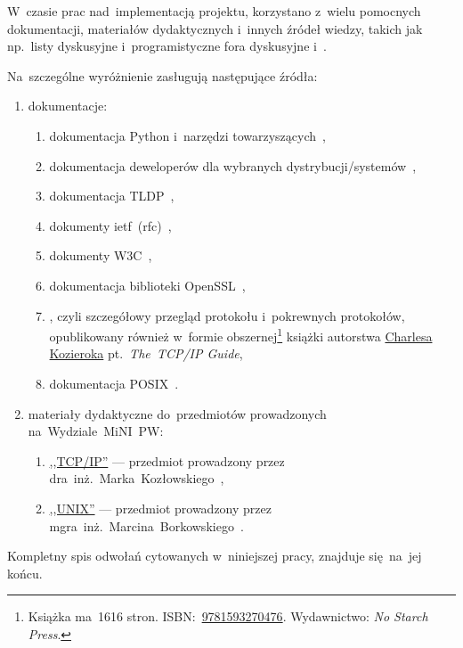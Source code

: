 \documentclass[thesis]{subfiles}
\begin{document}
W~czasie prac nad~implementacją projektu, korzystano z~wielu pomocnych dokumentacji, materiałów dydaktycznych i~innych źródeł wiedzy, takich jak np.~listy dyskusyjne i~programistyczne fora dyskusyjne  i~.

\noindent Na~szczególne wyróżnienie zasługują następujące źródła:\mynobreakpar
\begin{enumerate}
	\item dokumentacje:\mynobreakpar
	\begin{enumerate}
		\item dokumentacja Python i~narzędzi towarzyszących~\cite{python-doc},%
		\item dokumentacja deweloperów dla wybranych dystrybucji/systemów~\cite{archlinux-wiki,gentoo-wiki},
		\item dokumentacja TLDP~\cite{tldp},
		\item dokumenty \gls{ietf}~(\gls{rfc})~\cite{rfc-editor},
		\item dokumenty W3C~\cite{w3c},
		\item dokumentacja biblioteki OpenSSL~\cite{openssl-doc},
		\item {}, czyli szczegółowy przegląd protokołu  i~pokrewnych protokołów, opublikowany również w~formie obszernej\footnote{Książka ma~1616 stron. ISBN:~\href{https://www.nostarch.com/tcpip.htm}{9781593270476}. Wydawnictwo: \emph{No Starch Press}.} książki autorstwa \href{https://www.linkedin.com/in/charles-kozierok-708112/}{\mbox{Charlesa} \mbox{Kozieroka}} pt.~\emph{The~TCP/IP Guide},
		\item dokumentacja POSIX~\cite{posix}.
	\end{enumerate}
	\item materiały dydaktyczne do~przedmiotów prowadzonych na~Wydziale~MiNI~PW:\mynobreakpar
	\begin{enumerate}
		\item \href{http://www.mini.pw.edu.pl/~kozlowsm/tcpip}{,,TCP/IP''} --- przedmiot prowadzony przez dra~inż.~Marka~Kozłowskiego~\cite{kozlowski},
		\item \href{http://www.mini.pw.edu.pl/~marcinbo/strona/glowna/unix.html}{,,UNIX''} --- przedmiot prowadzony przez mgra~inż.~Marcina~Borkowskiego~\cite{borkowski}.
	\end{enumerate}
\end{enumerate}
Kompletny spis odwołań cytowanych w~niniejszej pracy, znajduje się~na~jej końcu. %
\end{document}
